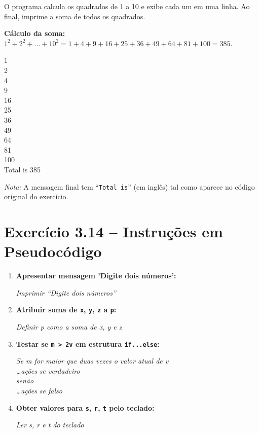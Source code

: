 \documentclass[12pt,a4paper]{article}
\begin{document}
\begin{respostabox}
O programa calcula os quadrados de 1 a 10 e exibe cada um em uma linha. Ao final,
imprime a soma de todos os quadrados.

\textbf{Cálculo da soma:} $1^2 + 2^2 + \ldots + 10^2 = 1+4+9+16+25+36+49+64+81+100 = 385$.

\begin{saida}
1\\2\\
\hspace{-0.2em}\hphantom{0}4\\9\\
16\\25\\36\\49\\64\\81\\100\\
Total is 385
\end{saida}

\textit{Nota:} A mensagem final tem ``\texttt{Total is}'' (em inglês) tal como aparece
no código original do exercício.
\end{respostabox}

\section{Exercício 3.14 -- Instruções em Pseudocódigo}

\begin{respostabox}
\begin{enumerate}[label=\textbf{\alph*)}]
\item \textbf{Apresentar mensagem 'Digite dois números':}
\begin{pseudo}\textit{Imprimir ``Digite dois números''}\end{pseudo}

\item \textbf{Atribuir soma de \texttt{x}, \texttt{y}, \texttt{z} a \texttt{p}:}
\begin{pseudo}\textit{Definir p como a soma de x, y e z}\end{pseudo}

\item \textbf{Testar se \texttt{m > 2v} em estrutura \texttt{if...else}:}
\begin{pseudo}
\textit{Se m for maior que duas vezes o valor atual de v}\\
\textit{\hphantom{Se}\ldots ações se verdadeiro}\\
\textit{senão}\\
\textit{\hphantom{Se}\ldots ações se falso}
\end{pseudo}

\item \textbf{Obter valores para \texttt{s}, \texttt{r}, \texttt{t} pelo teclado:}
\begin{pseudo}\textit{Ler s, r e t do teclado}\end{pseudo}
\end{enumerate}
\end{respostabox}
\end{document}
